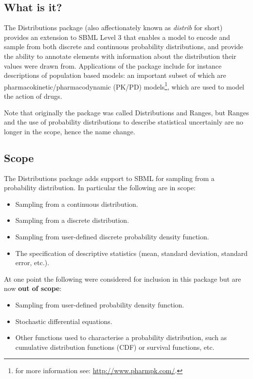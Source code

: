 \documentclass[draftspec]{sbmlpkgspec}
\newcommand{\distribshort}{\emph{distrib}\xspace}
\newcommand{\distrib}{Distributions\xspace}
\begin{document}
\subsection{What is it?}

The \distrib package (also affectionately known as \distribshort for
short) provides an extension to SBML Level 3 that enables a model to encode and sample from
both discrete and continuous probability distributions, and provide
the ability to annotate elements with information about the distribution their
values were drawn from. 
Applications of the package include for instance descriptions of
population based models: an important subset of which are
pharmacokinetic/pharmacodynamic (PK/PD) models\footnote{for more
  information see: \url{http://www.pharmpk.com/}.}, which are used to
model the action of drugs.

Note that originally the package was called Distributions and Ranges,
but Ranges and the use of probability distributions to describe
statistical uncertainly are no longer in the scope, hence the name change.

\subsection{Scope}

The \distrib package adds support to SBML for sampling from a
probability distribution. In particular the following are in scope:

\begin{itemize}
\item Sampling from a continuous distribution.
\item Sampling from a discrete distribution.
\item Sampling from user-defined discrete probability density function.
\item The specification of descriptive statistics (mean, standard
  deviation, standard error, etc.).
\end{itemize}

At one point the following were considered for inclusion in this
package but are now \textbf{out of scope}:

\begin{itemize}
\item Sampling from user-defined probability density function.
\item Stochastic differential equations.
\item Other functions used to characterise a probability distribution,
  such as cumulative distribution functions (CDF) or survival functions, etc.
\end{itemize}
\end{document}
